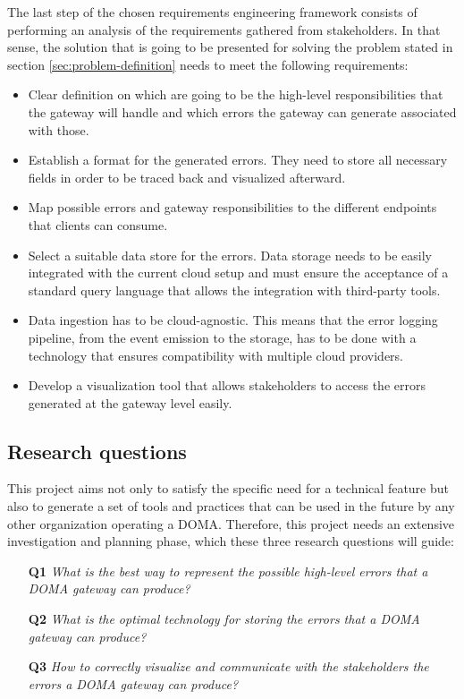 \documentclass[english, 12pt, a4paper, sci, utf8, a-1b, online]{aaltothesis}
\begin{document}
The last step of the chosen requirements engineering framework consists of performing an analysis of the requirements gathered from stakeholders. In that sense, the solution that is going to be presented for solving the problem stated in section \ref{sec:problem-definition} needs to meet the following requirements:

\begin{itemize}
    \item Clear definition on which are going to be the high-level responsibilities that the gateway will handle and which errors the gateway can generate associated with those.
    \item Establish a format for the generated errors. They need to store all necessary fields in order to be traced back and visualized afterward.
    \item Map possible errors and gateway responsibilities to the different endpoints that clients can consume.
    \item Select a suitable data store for the errors. Data storage needs to be easily integrated with the current cloud setup and must ensure the acceptance of a standard query language that allows the integration with third-party tools.
    \item Data ingestion has to be cloud-agnostic. This means that the error logging pipeline, from the event emission to the storage, has to be done with a technology that ensures compatibility with multiple cloud providers.
    \item Develop a visualization tool that allows stakeholders to access the errors generated at the gateway level easily.
\end{itemize}

\subsection{Research questions}
\label{sec:research-questions}


This project aims not only to satisfy the specific need for a technical feature but also to generate a set of tools and practices that can be used in the future by any other organization operating a DOMA. Therefore, this project needs an extensive investigation and planning phase, which these three research questions will guide:

\begin{itemize}
    \item[\textbf{Q1}] \textit{What is the best way to represent the possible high-level errors that a DOMA gateway can produce?}
    \item[\textbf{Q2}] \textit{What is the optimal technology for storing the errors that a DOMA gateway can produce?}
    \item[\textbf{Q3}] \textit{How to correctly visualize and communicate with the stakeholders the errors a DOMA gateway can produce?}
\end{itemize}
\end{document}
